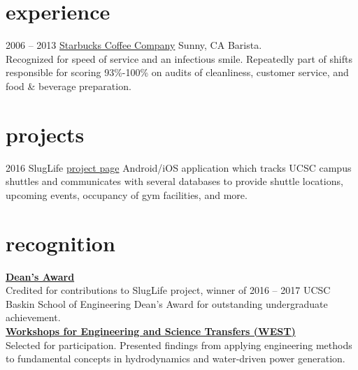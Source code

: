 \documentclass[]{./friggeri-cv}
\begin{document}
\section{experience}
\begin{entrylist}
\entry
    {2006 -- 2013}
    {\href{http://wisequacks.org/wp2/wp-content/uploads/2012/05/coffee.jpg}{Starbucks Coffee Company}}
    {Sunny, CA}
    {{\rolefont Barista.}\\Recognized for speed of service and an infectious smile.
    Repeatedly part of shifts responsible for scoring 93\%-100\% on audits of
    cleanliness, customer service, and food \& beverage preparation.}
\end{entrylist}\vspace{-1.5em}
\section{projects}%
\begin{entrylist}
  \entry
    {2016}
    {SlugLife}
    {\href{https://sites.google.com/a/ucsc.edu/sluglife/}{project page}}
    {Android/iOS application which tracks UCSC campus shuttles and
    communicates with several databases to provide shuttle locations, upcoming
    events, occupancy of gym facilities, and more.}
\end{entrylist}\vspace{-1.5em}
\section{recognition}
    {\href{http://honors.ucsc.edu/awards/dca/index.html}{\bf Dean's Award}}\\
    Credited for contributions to SlugLife project, winner of
    2016 -- 2017 UCSC Baskin School of Engineering Dean's Award for outstanding
    undergraduate achievement.%
    \newline\\
    {\href{http://isee.ucsc.edu/programs/west/index.html}%
    {\bf Workshops for Engineering and Science Transfers (WEST)}}\\
    {Selected for participation. Presented findings from applying 
    engineering methods to fundamental concepts in hydrodynamics and 
    water-driven power generation.}
\end{document}
